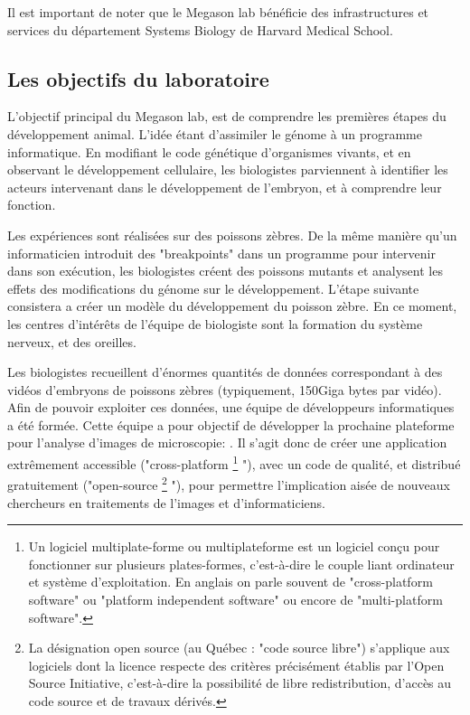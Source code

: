 Il est important de noter que le Megason lab bénéficie des infrastructures et services du département Systems Biology de Harvard Medical School.


\subsection{Les objectifs du laboratoire}
L'objectif principal du Megason lab, est de comprendre les premières étapes du développement animal.
L'idée étant d'assimiler le génome à un programme informatique.
En modifiant le code génétique d'organismes vivants, et en observant le développement cellulaire,
les biologistes parviennent à identifier les acteurs intervenant dans le développement de l'embryon, et à comprendre leur fonction.

Les expériences sont réalisées sur des poissons zèbres.
De la même manière qu'un informaticien introduit des "breakpoints" dans un programme pour intervenir dans son exécution,
les biologistes créent des poissons mutants et analysent les effets des modifications du génome sur le développement.
L'étape suivante consistera a créer un modèle du développement du poisson zèbre.
En ce moment, les centres d'intérêts de l'équipe de biologiste sont la formation du système nerveux, et des oreilles.

Les biologistes recueillent d'énormes quantités de données
correspondant à des vidéos d'embryons de poissons zèbres (typiquement, 150Giga bytes par vidéo).
Afin de pouvoir exploiter ces données,
une équipe de développeurs informatiques a été formée.
Cette équipe a pour objectif de développer la prochaine plateforme
pour l'analyse d'images de microscopie: {\gofigure}.
Il s'agit donc de créer une application extrêmement accessible ("cross-platform
\footnote{Un logiciel multiplate-forme ou multiplateforme est un logiciel conçu pour fonctionner sur plusieurs plates-formes, c'est-à-dire le couple liant ordinateur et système d'exploitation. En anglais on parle souvent de "cross-platform software" ou "platform independent software" ou encore de "multi-platform software".}
"), 
avec un code de qualité,
et distribué gratuitement ("open-source
\footnote{La désignation open source (au Québec : "code source libre") s'applique aux logiciels dont la licence respecte des critères précisément établis par l'Open Source Initiative, c'est-à-dire la possibilité de libre redistribution, d'accès au code source et de travaux dérivés.}
"),
pour permettre l'implication aisée de nouveaux chercheurs
en traitements de l'images et d'informaticiens.

